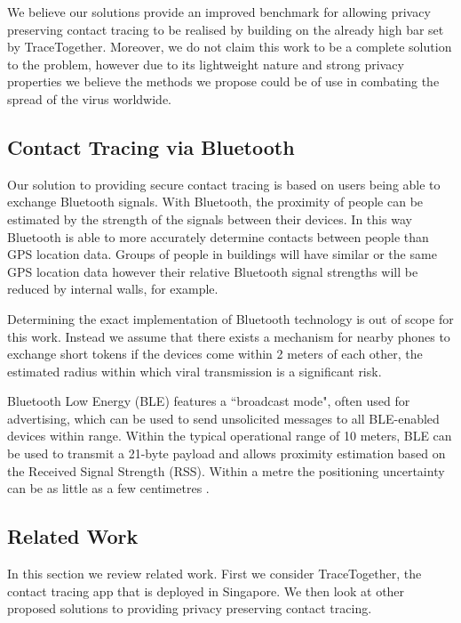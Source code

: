 \documentclass{article}
\begin{document}
We believe our solutions provide an improved benchmark for allowing privacy preserving contact tracing to be realised by building on the already high bar set by TraceTogether. Moreover, we do not claim this work to be a complete solution to the problem, however due to its lightweight nature and strong privacy properties we believe the methods we propose could be of use in combating the spread of the virus worldwide.

\subsection{Contact Tracing via Bluetooth} \label{sec:contact tracing via bluetooth}

Our solution to providing secure contact tracing is based on users being able to exchange Bluetooth signals. With Bluetooth, the proximity of people can be estimated by the strength of the signals between their devices. In this way Bluetooth is able to more accurately determine contacts between people than GPS location data. Groups of people in buildings will have similar or the same GPS location data however their relative Bluetooth signal strengths will be reduced by internal walls, for example. 

Determining the exact implementation of Bluetooth technology is out of scope for this work. Instead we assume that there exists a mechanism for nearby phones to exchange short tokens if the devices come within 2 meters of each other, the estimated radius within which viral transmission is a significant risk.

Bluetooth Low Energy (BLE) features a ``broadcast mode", often used for advertising, which can be used to send unsolicited messages to all BLE-enabled devices within range. Within the typical operational range of 10 meters, BLE can be used to transmit a 21-byte payload and allows proximity estimation based on the Received Signal Strength (RSS). Within a metre the positioning uncertainty can be as little as a few centimetres \cite{Faragher_BLE_2014}. 

\subsection{Related Work} \label{sec:related work}

In this section we review related work. First we consider TraceTogether, the contact tracing app that is deployed in Singapore. We then look at other proposed solutions to providing privacy preserving contact tracing.
\end{document}
